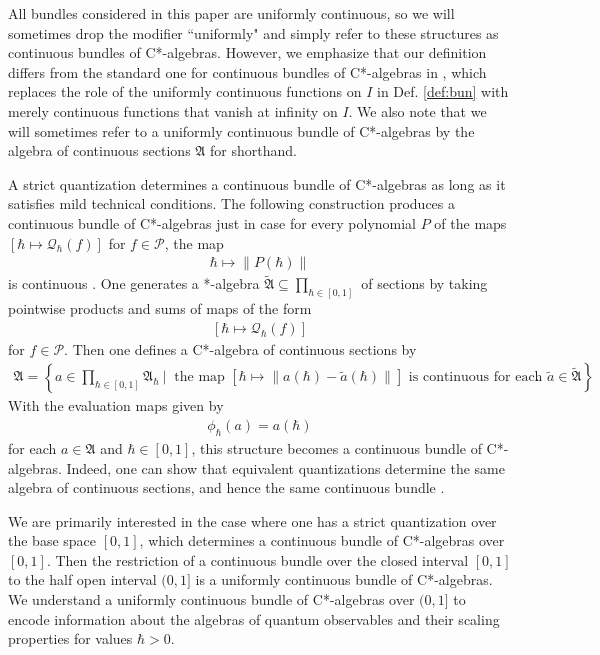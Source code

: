 \documentclass[sn-mathphys,Numbered]{sn-jnl}
\providecommand{\norm}[1]{\lVert#1\rVert}
\begin{document}
\noindent All bundles considered in this paper are uniformly continuous, so we will sometimes drop the modifier ``uniformly" and simply refer to these structures as continuous bundles of C*-algebras.  However, we emphasize that our definition differs from the standard one for continuous bundles of C*-algebras in \citet{KiWa95}, which replaces the role of the uniformly continuous functions on $I$ in Def. \ref{def:bun} with merely continuous functions that vanish at infinity on $I$.  We also note that we will sometimes refer to a uniformly continuous bundle of C*-algebras by the algebra of continuous sections $\mathfrak{A}$ for shorthand.

A strict quantization determines a continuous bundle of C*-algebras as long as it satisfies mild technical conditions.  The following construction produces a continuous bundle of C*-algebras just in case for every polynomial $P$ of the maps $[\hbar\mapsto \mathcal{Q}_\hbar(f)]$ for $f\in\mathcal{P}$, the map
\begin{align}
    \hbar\mapsto \norm{P(\hbar)}
\end{align}
is continuous \citep{BiHoRi04b}.  One generates a *-algebra $\tilde{\mathfrak{A}}\subseteq\prod_{\hbar\in [0,1]}$ of sections by taking pointwise products and sums of maps of the form
\begin{align}
\label{eq:quantization_sections}
    [\hbar\mapsto \mathcal{Q}_\hbar(f)]
\end{align}
for $f\in\mathcal{P}$.  Then one defines a C*-algebra of continuous sections by
\begin{align}
\label{eq:generating_sections}
    \mathfrak{A} = \left\{a\in\prod_{\hbar\in [0,1]}\mathfrak{A}_\hbar\ \Bigg|\ \text{ the map } \left[\hbar\mapsto\norm{a(\hbar)-\tilde{a}(\hbar)}\right]\text{ is continuous for each $\tilde{a}\in\tilde{\mathfrak{A}}$}\right\}.
\end{align}
With the evaluation maps given by
\begin{align}
    \phi_\hbar(a) = a(\hbar)
\end{align}
for each $a\in\mathfrak{A}$ and $\hbar\in [0,1]$, this structure becomes a continuous bundle of C*-algebras.  Indeed, one can show that equivalent quantizations determine the same algebra of continuous sections, and hence the same continuous bundle \citep{La98b}.

We are primarily interested in the case where one has a strict quantization over the base space $[0,1]$, which determines a continuous bundle of C*-algebras over $[0,1]$.  Then the restriction of a continuous bundle over the closed interval $[0,1]$ to the half open interval $(0,1]$ is a uniformly continuous bundle of C*-algebras.  We understand a uniformly continuous bundle of C*-algebras over $(0,1]$ to encode information about the algebras of quantum observables and their scaling properties for values $\hbar>0$.
\end{document}
